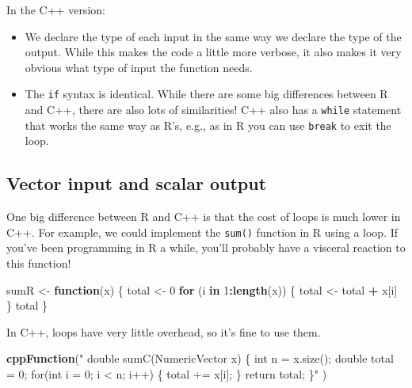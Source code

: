 \documentclass[
]{krantz}
\makeatletter
\newenvironment{Shaded}{\begin{snugshade}}{\end{snugshade}}
\newcommand{\ControlFlowTok}[1]{\textcolor[rgb]{0.27,0.27,0.27}{\textbf{#1}}}
\newcommand{\DecValTok}[1]{\textcolor[rgb]{0.06,0.06,0.06}{#1}}
\newcommand{\KeywordTok}[1]{\textcolor[rgb]{0.27,0.27,0.27}{\textbf{#1}}}
\newcommand{\NormalTok}[1]{#1}
\newcommand{\OperatorTok}[1]{\textcolor[rgb]{0.43,0.43,0.43}{\textbf{#1}}}
\newcommand{\StringTok}[1]{\textcolor[rgb]{0.5,0.5,0.5}{#1}}
\newenvironment{kframe}{%
\medskip{}
\setlength{\fboxsep}{.8em}
 \def\at@end@of@kframe{}%
 \ifinner\ifhmode%
  \def\at@end@of@kframe{\end{minipage}}%
  \begin{minipage}{\columnwidth}%
 \fi\fi%
 \def\FrameCommand##1{\hskip\@totalleftmargin \hskip-\fboxsep
 \colorbox{shadecolor}{##1}\hskip-\fboxsep
     \hskip-\linewidth \hskip-\@totalleftmargin \hskip\columnwidth}%
 \MakeFramed {\advance\hsize-\width
   \@totalleftmargin\z@ \linewidth\hsize
   \@setminipage}}%
 {\par\unskip\endMakeFramed%
 \at@end@of@kframe}
\renewenvironment{Shaded}{\begin{kframe}}{\end{kframe}}
\makeatother
\begin{document}
In the C++ version:

\begin{itemize}
\item
  We declare the type of each input in the same way we declare the type of the output. While this makes the code a little more verbose, it also makes it very obvious what type of input the function needs.
\item
  The \texttt{if} syntax is identical. While there are some big differences between R and C++, there are also lots of similarities! C++ also has a \texttt{while} statement that works the same way as R's, e.g., as in R you can use \texttt{break} to exit the loop.
\end{itemize}

\hypertarget{vector-input-and-scalar-output}{%
\subsection{Vector input and scalar output}\label{vector-input-and-scalar-output}}

One big difference between R and C++ is that the cost of loops is much lower in C++. For example, we could implement the \texttt{sum()} function in R using a loop. If you've been programming in R a while, you'll probably have a visceral reaction to this function!

\begin{Shaded}
\begin{Highlighting}[]
\NormalTok{sumR \textless{}{-}}\StringTok{ }\ControlFlowTok{function}\NormalTok{(x) \{}
\NormalTok{    total \textless{}{-}}\StringTok{ }\DecValTok{0}
    \ControlFlowTok{for}\NormalTok{ (i }\ControlFlowTok{in} \DecValTok{1}\OperatorTok{:}\KeywordTok{length}\NormalTok{(x)) \{}
\NormalTok{        total \textless{}{-}}\StringTok{ }\NormalTok{total }\OperatorTok{+}\StringTok{ }\NormalTok{x[i]}
\NormalTok{    \}}
\NormalTok{    total}
\NormalTok{\}}
\end{Highlighting}
\end{Shaded}

In C++, loops have very little overhead, so it's fine to use them.

\begin{Shaded}
\begin{Highlighting}[]
\KeywordTok{cppFunction}\NormalTok{(}\StringTok{"}
\StringTok{  double sumC(NumericVector x) \{}
\StringTok{    int n = x.size();}
\StringTok{    double total = 0;}
\StringTok{    for(int i = 0; i \textless{} n; i++) \{}
\StringTok{      total += x[i];}
\StringTok{    \}}
\StringTok{    return total;}
\StringTok{  \}"}
\NormalTok{)}
\end{Highlighting}
\end{Shaded}
\end{document}
